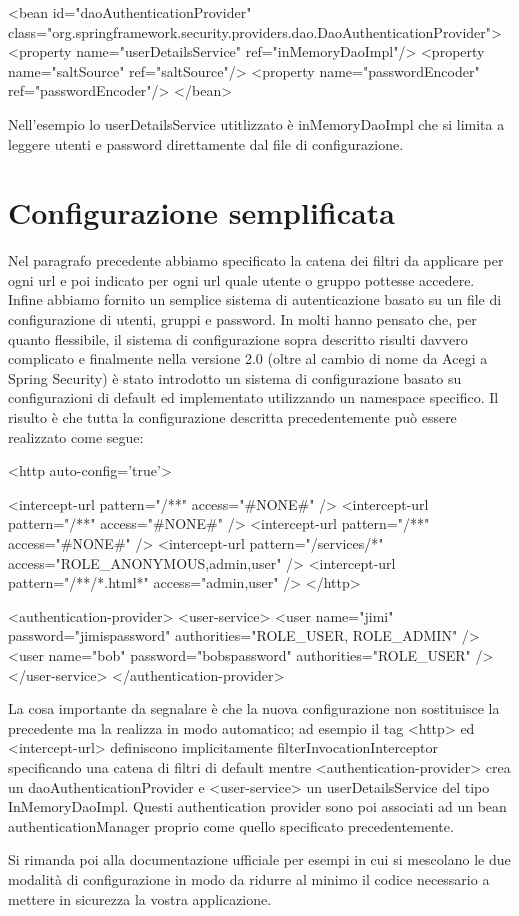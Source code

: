 \begin{xml}
<bean id="daoAuthenticationProvider"
  class="org.springframework.security.providers.dao.DaoAuthenticationProvider">
  <property name="userDetailsService" ref="inMemoryDaoImpl"/>
  <property name="saltSource" ref="saltSource"/>
  <property name="passwordEncoder" ref="passwordEncoder"/>
</bean>    
\end{xml}
  
Nell'esempio lo userDetailsService utitlizzato è inMemoryDaoImpl che si limita a leggere utenti e password direttamente dal file di configurazione.

\section{Configurazione semplificata}

Nel paragrafo precedente abbiamo specificato la catena dei filtri da applicare per ogni url e poi indicato per ogni url quale utente o gruppo pottesse accedere. Infine abbiamo fornito un semplice sistema di autenticazione basato su un file di configurazione di utenti, gruppi e password. In molti hanno pensato che, per quanto flessibile, il sistema di configurazione sopra descritto risulti davvero complicato e finalmente nella versione 2.0 (oltre al cambio di nome da Acegi a Spring Security) è stato introdotto un sistema di configurazione basato su configurazioni di default ed implementato utilizzando un namespace specifico. Il risulto è che tutta la configurazione descritta precedentemente può essere realizzato come segue:

\begin{xml}
<http auto-config='true'>

<intercept-url pattern="/**" access="#NONE#" />
<intercept-url pattern="/**" access="#NONE#" />
<intercept-url pattern="/**" access="#NONE#" />
<intercept-url pattern="/services/*" access="ROLE_ANONYMOUS,admin,user" />
<intercept-url pattern="/**/*.html*" access="admin,user" />
</http>

<authentication-provider>
   <user-service>
    <user name="jimi" password="jimispassword" authorities="ROLE_USER, ROLE_ADMIN" />
    <user name="bob" password="bobspassword" authorities="ROLE_USER" />
   </user-service>
</authentication-provider>
\end{xml}

La cosa importante da segnalare è che la nuova configurazione non sostituisce la precedente ma la realizza in modo automatico; ad esempio il tag <http> ed <intercept-url> definiscono implicitamente  filterInvocationInterceptor specificando una catena di filtri di default  mentre <authentication-provider> crea un daoAuthenticationProvider e <user-service> un  userDetailsService del tipo InMemoryDaoImpl. Questi authentication provider sono poi associati ad un bean authenticationManager proprio come quello specificato precedentemente.

Si rimanda poi alla documentazione ufficiale per esempi in cui si mescolano le due modalità di configurazione in modo da ridurre al minimo il codice necessario a mettere in sicurezza la vostra applicazione.
